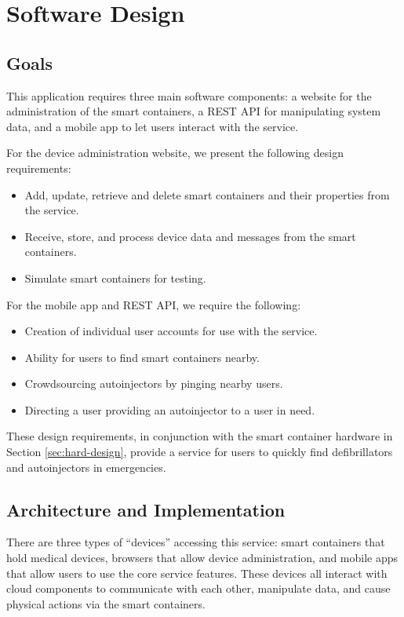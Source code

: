 \section{Software Design} \label{sec:soft-design}

\onehalfspacing

\subsection{Goals} \label{sec:soft-goals}

This application requires three main software components: a website for the administration of the smart containers, a REST API for manipulating system data, and a mobile app to let users interact with the service. 

For the device administration website, we present the following design requirements:
\begin{itemize}
    \item Add, update, retrieve and delete smart containers and their properties from the service.
    \item Receive, store, and process device data and messages from the smart containers.
    \item Simulate smart containers for testing.
\end{itemize}

For the mobile app and REST API, we require the following:
\begin{itemize}
    \item Creation of individual user accounts for use with the service.
    \item Ability for users to find smart containers nearby.
    \item Crowdsourcing autoinjectors by pinging nearby users.
    \item Directing a user providing an autoinjector to a user in need.
\end{itemize}

These design requirements, in conjunction with the smart container hardware in Section \ref{sec:hard-design}, provide a service for users to quickly find defibrillators and autoinjectors in emergencies.

\subsection{Architecture and Implementation}

There are three types of ``devices'' accessing this service: smart containers that hold medical devices, browsers that allow device administration, and mobile apps that allow users to use the core service features. These devices all interact with cloud components to communicate with each other, manipulate data, and cause physical actions via the smart containers. 

